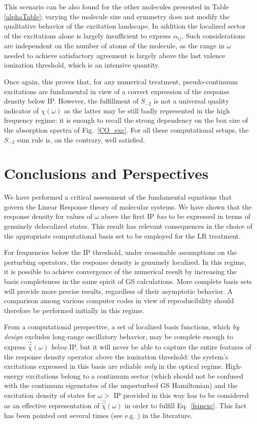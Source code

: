 \documentclass[reprint,aps,prb]{revtex4-1}
\newcommand{\op}[1]{\hat {#1}}
\newcommand{\sop}[1]{\op{\op {#1}}}
\begin{document}
This scenario can be also found for the other molecules presented in Table \ref{alphaTable};
varying the molecule size and symmetry does not modify the qualitative behavior of the excitation landscape. In addition the
localized sector of the excitations alone is largely insufficient to express $\alpha_{ij}$.
Such considerations are independent on the number of atoms of the molecule, as the range in $\omega$ needed to
achieve satisfactory agreement is largely above the last valence ionization threshold, which is
an intensive quantity.

Once again, this proves that, for any numerical treatment,  pseudo-continuum excitations are fundamental in view of a correct expression
of the response density below IP.
However, the fulfillment of $S_{-2}$ is not a universal quality indicator of $\chi(\omega)$ as the latter may be still badly represented in the high frequency regime:
it is enough to recall
the strong dependency on the box size of the absorption spectra of Fig.~\ref{CO_exc}.
For all these computational setups, the $S_{-2}$ sum rule is, on the contrary, well satisfied.

\section{Conclusions and Perspectives}

We have performed a critical assessment of the fundamental equations that govern the Linear Response theory of molecular systems.
We have shown that the response density for values of $\omega$ above the first IP \emph{has} to be expressed in terms of genuinely delocalized states.
This result has relevant consequences in the choice of the  appropriate computational basis set to be employed for the LR treatment.

For frequencies below the IP threshold, under reasonable assumptions on the perturbing operators, the response density is genuinely localized.
In this regime, it is possible to achieve convergence of the numerical result by increasing the basis completeness in the same spirit of GS calculations.
More complete basis sets will provide more precise results, regardless of their asymptotic behavior. A comparison among various computer codes in view of reproducibility should therefore be performed initially in this regime.

From a computational perspective, a set of localized basis functions, which \emph{by design} excludes long-range oscillatory behavior, may be complete
enough to express $\sop \chi(\omega)$ \emph{below} IP, but it will never be able to capture the entire features of the response density operator above
the ionization threshold: the system's excitations expressed in this basis are reliable \emph{only} in the optical regime.
High-energy excitations belong to a continuum sector (which should not be confused with the continuum eigenstates of the unperturbed GS Hamiltonian)
and the excitation density of states for $\omega >$ IP provided in this way has to be considered as an effective representation of $\sop \chi(\omega)$ in order to fulfill Eq.~\eqref{fsinexc}. This fact has been pointed out several times (see e.g. \cite{giustino2012,giustino2014}) in the literature.
\end{document}
